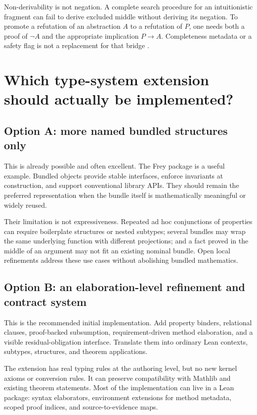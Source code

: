 \documentclass[11pt,a4paper]{article}
\theoremstyle{definition}
\begin{document}
Non-derivability is not negation. A complete search procedure for an
intuitionistic fragment can fail to derive excluded middle without deriving
its negation. To promote a refutation of an abstraction $A$ to a refutation of
$P$, one needs both a proof of $\neg A$ and the appropriate implication
$P\to A$. Completeness metadata or a safety flag is not a replacement for that
bridge \cite{round2a,round2b}.

\section{Which type-system extension should actually be implemented?}\label{sec:extensions}
\subsection{Option A: more named bundled structures only}
This is already possible and often excellent. The Frey package is a useful
example. Bundled objects provide stable interfaces, enforce invariants at
construction, and support conventional library APIs. They should remain the
preferred representation when the bundle itself is mathematically meaningful
or widely reused.

Their limitation is not expressiveness. Repeated ad hoc conjunctions of
properties can require boilerplate structures or nested subtypes; several
bundles may wrap the same underlying function with different projections;
and a fact proved in the middle of an argument may not fit an existing nominal
bundle. Open local refinements address these use cases without abolishing
bundled mathematics.

\subsection{Option B: an elaboration-level refinement and contract system}
This is the recommended initial implementation. Add property binders,
relational clauses, proof-backed subsumption, requirement-driven method
elaboration, and a visible residual-obligation interface. Translate them into
ordinary Lean contexts, subtypes, structures, and theorem applications.

The extension has real typing rules at the authoring level, but no new kernel
axioms or conversion rules. It can preserve compatibility with Mathlib and
existing theorem statements. Most of the implementation can live in a Lean
package: syntax elaborators, environment extensions for method metadata,
scoped proof indices, and source-to-evidence maps.
\end{document}
